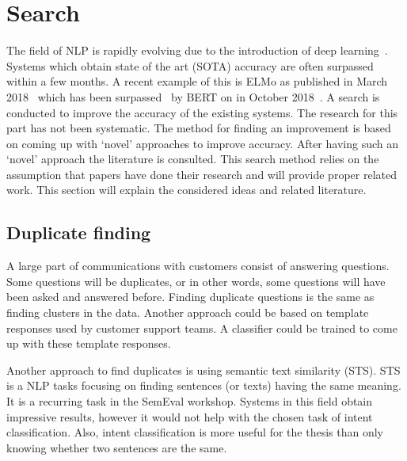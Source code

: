 \section{Search}
\label{sec:search}

The field of NLP is rapidly evolving due to the introduction of deep learning~\citep{cambria2014jumping}.
Systems which obtain state of the art (SOTA) accuracy are often surpassed within a few months.
A recent example of this is ELMo as published in March 2018~\citep{peters2018} which has been surpassed~\citep{young2018recent} by BERT on in October 2018~\citep{devlin2018}.
A search is conducted to improve the accuracy of the existing systems.
The research for this part has not been systematic.
The method for finding an improvement is based on coming up with `novel' approaches to improve accuracy.
After having such an `novel' approach the literature is consulted.
This search method relies on the assumption that papers have done their research and will provide proper related work.
This section will explain the considered ideas and related literature.

\subsection{Duplicate finding}
\label{subsec:duplicate_finding}
A large part of communications with customers consist of answering questions.
Some questions will be duplicates, or in other words, some questions will have been asked and answered before.
Finding duplicate questions is the same as finding clusters in the data.
Another approach could be based on template responses used by customer support teams.
A classifier could be trained to come up with these template responses.

Another approach to find duplicates is using semantic text similarity (STS).
STS is a NLP tasks focusing on finding sentences (or texts) having the same meaning.
It is a recurring task in the SemEval workshop.
Systems in this field obtain impressive results, however it would not help with the chosen task of intent classification.
Also, intent classification is more useful for the thesis than only knowing whether two sentences are the same.

